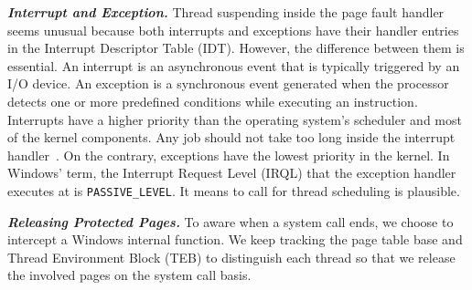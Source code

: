 \textbf{\textit{Interrupt and Exception.}} Thread suspending inside the page fault handler seems unusual because both interrupts and exceptions have their handler entries in the Interrupt Descriptor Table (IDT). However, the difference between them is essential.  An interrupt is an asynchronous event that is typically triggered by an I/O device. An exception is a synchronous event generated when the processor detects one or more predefined conditions while executing an instruction. Interrupts have a higher priority than the operating system's scheduler and most of the kernel components. Any job should not take too long inside the interrupt handler~\cite{msdnwatchdog}.  On the contrary, exceptions have the lowest priority in the kernel. In Windows' term, the Interrupt Request Level (IRQL) that the exception handler executes at is \texttt{PASSIVE\_LEVEL}. It means to call for thread scheduling is plausible.






\textbf{\textit{Releasing Protected Pages.}} To aware when a system call ends, we choose to intercept a Windows internal function. We keep tracking the page table base and Thread Environment Block (TEB) to distinguish each thread so that we release the involved pages on the system call basis.  



